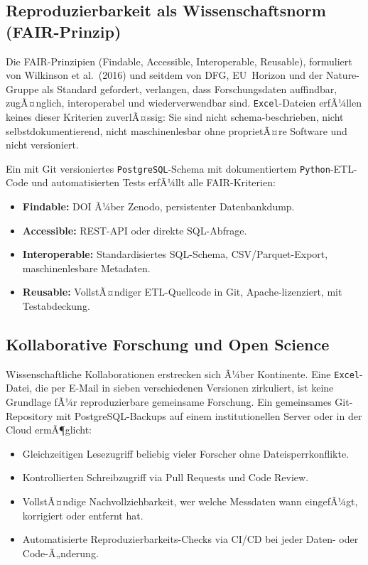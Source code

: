 ﻿\documentclass[12pt,a4paper]{report}
\theoremstyle{definition}
\theoremstyle{remark}
\newcommand{\excel}{\texttt{Excel}}
\newcommand{\pg}{\texttt{PostgreSQL}}
\newcommand{\py}{\texttt{Python}}
\begin{document}
\subsection{Reproduzierbarkeit als Wissenschaftsnorm (FAIR-Prinzip)}

Die FAIR-Prinzipien (Findable, Accessible, Interoperable, Reusable),
formuliert von Wilkinson et al.\ (2016) und seitdem von DFG,
EU~Horizon und der Nature-Gruppe als Standard gefordert, verlangen,
dass Forschungsdaten auffindbar, zugÃ¤nglich, interoperabel und
wiederverwendbar sind.
\excel-Dateien erfÃ¼llen keines dieser Kriterien zuverlÃ¤ssig:
Sie sind nicht schema-beschrieben, nicht selbstdokumentierend,
nicht maschinenlesbar ohne proprietÃ¤re Software und nicht versioniert.

Ein mit Git versioniertes \pg-Schema mit dokumentiertem \py-ETL-Code
und automatisierten Tests erfÃ¼llt alle FAIR-Kriterien:
\begin{itemize}[leftmargin=1.5em, itemsep=2pt]
  \item \textbf{Findable:} DOI Ã¼ber Zenodo, persistenter Datenbankdump.
  \item \textbf{Accessible:} REST-API oder direkte SQL-Abfrage.
  \item \textbf{Interoperable:} Standardisiertes SQL-Schema,
        CSV/Parquet-Export, maschinenlesbare Metadaten.
  \item \textbf{Reusable:} VollstÃ¤ndiger ETL-Quellcode in Git,
        Apache-lizenziert, mit Testabdeckung.
\end{itemize}

\subsection{Kollaborative Forschung und Open Science}

Wissenschaftliche Kollaborationen erstrecken sich Ã¼ber Kontinente.
Eine \excel-Datei, die per E-Mail in sieben verschiedenen Versionen
zirkuliert, ist keine Grundlage fÃ¼r reproduzierbare gemeinsame
Forschung.
Ein gemeinsames Git-Repository mit PostgreSQL-Backups auf einem
institutionellen Server oder in der Cloud ermÃ¶glicht:
\begin{itemize}[leftmargin=1.5em, itemsep=2pt]
  \item Gleichzeitigen Lesezugriff beliebig vieler Forscher ohne
        Dateisperrkonflikte.
  \item Kontrollierten Schreibzugriff via Pull Requests und Code Review.
  \item VollstÃ¤ndige Nachvollziehbarkeit, wer welche Messdaten wann
        eingefÃ¼gt, korrigiert oder entfernt hat.
  \item Automatisierte Reproduzierbarkeits-Checks via CI/CD bei jeder
        Daten- oder Code-Ã„nderung.
\end{itemize}
\end{document}
